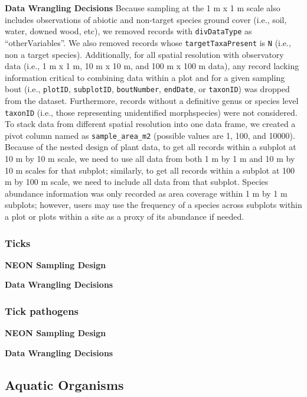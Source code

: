 \documentclass[
  12pt,
]{article}
\begin{document}
\textbf{Data Wrangling Decisions} Because sampling at the 1 m x 1 m scale also includes observations of abiotic and non-target species ground cover (i.e., soil, water, downed wood, etc), we removed records with \texttt{divDataType} as ``otherVariables''. We also removed records whose \texttt{targetTaxaPresent} is \texttt{N} (i.e., non a target species). Additionally, for all spatial resolution with observatory data (i.e., 1 m x 1 m, 10 m x 10 m, and 100 m x 100 m data), any record lacking information critical to combining data within a plot and for a given sampling bout (i.e., \texttt{plotID}, \texttt{subplotID}, \texttt{boutNumber}, \texttt{endDate}, or \texttt{taxonID}) was dropped from the dataset. Furthermore, records without a definitive genus or species level \texttt{taxonID} (i.e., those representing unidentified morphspecies) were not considered. To stack data from different spatial resolution into one data frame, we created a pivot column named as \texttt{sample\_area\_m2} (possible values are 1, 100, and 10000). Because of the nested design of plant data, to get all records within a subplot at 10 m by 10 m scale, we need to use all data from both 1 m by 1 m and 10 m by 10 m scales for that subplot; similarly, to get all records within a subplot at 100 m by 100 m scale, we need to include all data from that subplot. Species abundance information was only recorded as area coverage within 1 m by 1 m subplots; however, users may use the frequency of a species across subplots within a plot or plots within a site as a proxy of its abundance if needed.

\hypertarget{ticks}{%
\subsubsection{Ticks}\label{ticks}}

\textbf{NEON Sampling Design}

\textbf{Data Wrangling Decisions}

\hypertarget{tick-pathogens}{%
\subsubsection{Tick pathogens}\label{tick-pathogens}}

\textbf{NEON Sampling Design}

\textbf{Data Wrangling Decisions}

\hypertarget{aquatic-organisms}{%
\subsection{Aquatic Organisms}\label{aquatic-organisms}}
\end{document}
